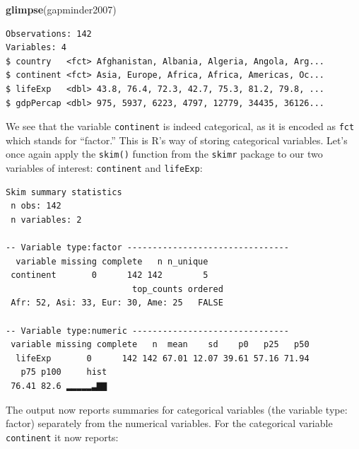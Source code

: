 \documentclass[12pt,]{krantz}
\makeatletter
\newenvironment{Shaded}{\begin{snugshade}}{\end{snugshade}}
\newcommand{\KeywordTok}[1]{\textcolor[rgb]{0.27,0.27,0.27}{\textbf{#1}}}
\newcommand{\StringTok}[1]{\textcolor[rgb]{0.5,0.5,0.5}{#1}}
\newcommand{\OperatorTok}[1]{\textcolor[rgb]{0.43,0.43,0.43}{\textbf{#1}}}
\newcommand{\NormalTok}[1]{#1}
\newenvironment{kframe}{%
\medskip{}
\setlength{\fboxsep}{.8em}
 \def\at@end@of@kframe{}%
 \ifinner\ifhmode%
  \def\at@end@of@kframe{\end{minipage}}%
  \begin{minipage}{\columnwidth}%
 \fi\fi%
 \def\FrameCommand##1{\hskip\@totalleftmargin \hskip-\fboxsep
 \colorbox{shadecolor}{##1}\hskip-\fboxsep
     \hskip-\linewidth \hskip-\@totalleftmargin \hskip\columnwidth}%
 \MakeFramed {\advance\hsize-\width
   \@totalleftmargin\z@ \linewidth\hsize
   \@setminipage}}%
 {\par\unskip\endMakeFramed%
 \at@end@of@kframe}
\renewenvironment{Shaded}{\begin{kframe}}{\end{kframe}}
\theoremstyle{definition}
\theoremstyle{definition}
\theoremstyle{definition}
\theoremstyle{remark}
\makeatother
\begin{document}
\begin{Shaded}
\begin{Highlighting}[]
\KeywordTok{glimpse}\NormalTok{(gapminder2007)}
\end{Highlighting}
\end{Shaded}

\begin{verbatim}
Observations: 142
Variables: 4
$ country   <fct> Afghanistan, Albania, Algeria, Angola, Arg...
$ continent <fct> Asia, Europe, Africa, Africa, Americas, Oc...
$ lifeExp   <dbl> 43.8, 76.4, 72.3, 42.7, 75.3, 81.2, 79.8, ...
$ gdpPercap <dbl> 975, 5937, 6223, 4797, 12779, 34435, 36126...
\end{verbatim}

We see that the variable \texttt{continent} is indeed categorical, as it
is encoded as \texttt{fct} which stands for ``factor.'' This is R's way
of storing categorical variables. Let's once again apply the
\texttt{skim()} function from the \texttt{skimr} package to our two
variables of interest: \texttt{continent} and \texttt{lifeExp}:

\begin{Shaded}
\end{Shaded}

\begin{verbatim}
Skim summary statistics
 n obs: 142 
 n variables: 2 

-- Variable type:factor --------------------------------
  variable missing complete   n n_unique
 continent       0      142 142        5
                         top_counts ordered
 Afr: 52, Asi: 33, Eur: 30, Ame: 25   FALSE

-- Variable type:numeric -------------------------------
 variable missing complete   n  mean    sd    p0   p25   p50
  lifeExp       0      142 142 67.01 12.07 39.61 57.16 71.94
   p75 p100     hist
 76.41 82.6 ▂▂▂▂▂▃▇▇
\end{verbatim}

The output now reports summaries for categorical variables (the variable
type: factor) separately from the numerical variables. For the
categorical variable \texttt{continent} it now reports:
\end{document}
